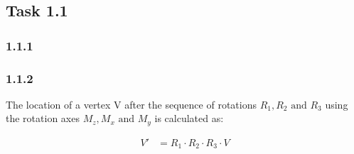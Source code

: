\subsection*{Task 1.1}

\subsubsection*{1.1.1}

\subsubsection*{1.1.2}

The location of a vertex V after the sequence of rotations $R_1, R_2 \text{ and } R_3$ using the rotation axes $M_z, M_x \text{ and } M_y$ is calculated as:

\begin{align*}
V' &= R_1\cdot R_2\cdot R_3\cdot V  \\
\end{align*}